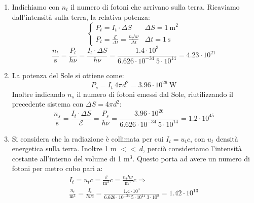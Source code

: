 \documentclass[12pt,twoside,a4]{article}
\begin{document}
\begin{solution}
\begin{enumerate}[label=(\textit{\roman*})]
	\item Indichiamo con $n_t$ il numero di fotoni che arrivano sulla terra. Ricaviamo dall'intensità sulla terra, la relativa potenza: 
	\begin{equation*}\begin{cases}
    P_t = I_t \cdot \Delta S & \Delta S = 1 \ \mathrm{m}^2 \\[1em]
    P_t = \frac{\mathcal{E}}{\Delta t} = \frac{n_t h \nu}{\Delta t} & \Delta t = 1 \ \mathrm{s} 
	\end{cases}\end{equation*} 
	\begin{equation*}
	\frac{n_t}{\mathrm{s}} = \frac{P_t}{h\nu} = \frac{I_t \cdot \Delta S}{h \nu} = \frac{1.4 \cdot 10^3}{6.626 \cdot 10^{-34} \ 5 \cdot 10^{14}} = 4.23 \cdot 10^{21}  
	\end{equation*}
	
	\item La potenza del Sole si ottiene come: 
	\begin{equation*}
    P_s = I_t \ 4\pi d^2 = 3.96 \cdot 10^{26} \ \mathrm{W}  
	\end{equation*}
	Inoltre indicando $n_s$ il numero di fotoni emessi dal Sole, riutilizzando il precedente sistema con $\Delta S = 4 \pi d^2$:
	\begin{equation*}
	\frac{n_s}{\mathrm{s}} = \frac{I_t \cdot \Delta S}{\mathcal{E}} = \frac{P_s}{h\nu}=\frac{3.96 \cdot 10^{26}}{6.626 \cdot 10^{-34} \ 5 \cdot 10^{14}} = 1.2 \cdot 10^{45} 
	\end{equation*}


	\item Si considera che la radiazione è collimata per cui $I_t = u_t c $, con $u_t$ densità energetica sulla terra. Inoltre 1 m $<< \ d$, perciò consideriamo l'intensità costante all'interno del volume di 1 m$^3$. Questo porta ad avere un numero di fotoni per metro cubo pari a: 
	\begin{gather*}
	I_t = u_t c = \frac{\mathcal{E}}{\mathrm{m}^3} c = \frac{n_t h \nu}{\mathrm{m}^3} c \Rightarrow \\
 	\frac{n_t}{\mathrm{m}^3} = \frac{I_t}{h\nu c} = \frac{1.4 \cdot 10^{3}}{6.626 \cdot 10^{-34} \ 5 \cdot 10^{14} \ 3 \cdot 10^{8}} = 1.42 \cdot 10^{13}   
	\end{gather*}
\end{enumerate}
\end{solution}
\end{document}
